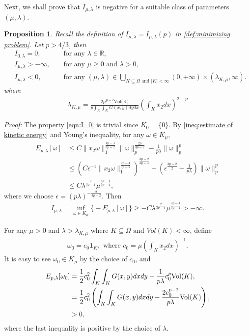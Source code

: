 \documentclass[11pt,letterpaper]{amsart}
\newtheorem{prop}[thm]{Proposition}
\theoremstyle{definition}
\theoremstyle{remark}
\newcommand{\R}{\mathbb{R}}
\newcommand{\eps}{\epsilon}
\renewcommand{\tt}[1]{\text{#1}}
\numberwithin{equation}{section}
\begin{document}
Next, we shall prove that $I_{\mu,\lambda}$ is negative for a suitable class of parameters $(\mu,\lambda)$. 

\begin{prop}\label{prop:propoties of I_mu} Recall the definition of $I_{\mu,\lambda}=I_{\mu,\lambda}(p)$ in \eqref{def:minimizing problem}. Let $p>4/3$, then
    \begin{align}
        & I_{0, \lambda}=0, && \text{ for any $\lambda\in \R$}, \label{eqn:I_0}\\
        & I_{\mu, \lambda}>-\infty, && \text{ for any } \mu\geq 0 \text{ and } \lambda>0 ,\label{eqn:I_mu is finite}\\
        & I_{\mu, \lambda}<0, && \text{ for any } (\mu,\lambda)\in \bigcup_{K\subseteq \Omega \text{ and } |K|<\infty}
         (0, +\infty ) \times (\lambda_{K,\mu},\infty ). \label{ineq:negativity of I_mu}
    \end{align}
    where
    \begin{align*}
        \lambda_{K,\mu}=\frac{2 \mu^{p-2}\tt{Vol(K)}}{p \int_K\int_K G(x,y) dydx}\left(\int_K x_2 dx\right)^{2-p}
    \end{align*}
\end{prop}
\noindent\textit{Proof: } The property \eqref{eqn:I_0} is trivial since $K_0=\{0\}$. By \eqref{ineq:estimate of kinetic energy} and Young's inequality, for any $\omega\in K_\mu$,
\begin{align*}
    E_{p,\lambda}[\omega]&\leq C\|x_2\omega\|_1^{\frac{4p-4}{3p-2}}\|\omega\|_p^{\frac{2p}{3p-2}}-\frac{1}{p\lambda}\|\omega\|_p^p\\
    &\leq \left(C\eps^{-1}\|x_2\omega\|_1^{\frac{4p-4}{3p-2}}\right)^{\frac{3p-2}{3p-4}}+\left(\eps^{\frac{3p-2}{2}}-\frac{1}{p\lambda}\right)\|\omega\|_p^p\\
    &\leq C\lambda^{\frac{2}{3p-4}}\mu^{\frac{4p-4}{3p-4}},
\end{align*}
where we choose $\eps=(p\lambda)^{-\frac{2}{3p-2}}$. Then 
\begin{align}
    I_{\mu,\lambda}=\inf_{\omega\in K_{\mu}}\big\{-E_{p,\lambda}[\omega ]\big\}\geq -C\lambda^{\frac{2}{3p-4}}\mu^{\frac{4p-4}{3p-4}}>-\infty.\label{ineq:lowerbound of I_mu,lambda}
\end{align}

For any $ \mu>0 $ and $ \lambda>\lambda_{K,\mu}$ where $K\subseteq \Omega \text{ and } Vol(K)<\infty$, define
\begin{align*}
    \omega_0=c_0 \mathbf{1}_{K}, \text{ where } c_0=\mu\left(\int_{K}x_2dx\right)^{-1}.
\end{align*}
It is easy to see $\omega_0\in K_\mu $ by the choice of $c_0$, and 
\begin{align}
    E_{p,\lambda}[\omega_0]&= \frac{1}{2}c_0^2\int_{K}\int_{K}G(x,y)dxdy-\frac{1}{p\lambda}c_0^p \tt{Vol}(K), \notag\\
    &=\frac{1}{2}c_0^2\left(\int_{K}\int_{K}G(x,y)dxdy-\frac{2c_0^{p-2}}{p\lambda}\tt{Vol}(K)\right), \notag\\
    &>0, \label{eqn:lowerbound of -I_mu}
\end{align}
where the last inequality is positive by the choice of $\lambda$. 
\end{document}
